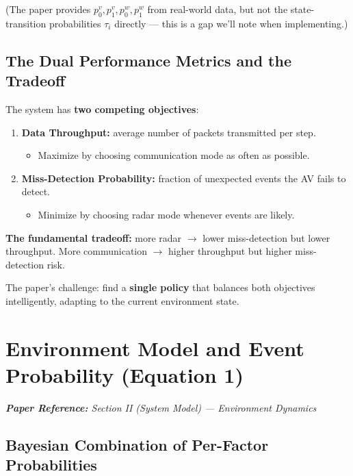 \documentclass[12pt,a4paper]{article}
\begin{document}
(The paper provides $p^v_0, p^v_1, p^w_0, p^w_1$ from real-world data, but not the state-transition probabilities $\tau_i$ directly --- this is a gap we'll note when implementing.)

\subsection{The Dual Performance Metrics and the Tradeoff}

The system has \textbf{two competing objectives}:

\begin{enumerate}
    \item \textbf{Data Throughput:} average number of packets transmitted per step.
    \begin{itemize}
        \item Maximize by choosing communication mode as often as possible.
    \end{itemize}

    \item \textbf{Miss-Detection Probability:} fraction of unexpected events the AV fails to detect.
    \begin{itemize}
        \item Minimize by choosing radar mode whenever events are likely.
    \end{itemize}
\end{enumerate}

\noindent\textbf{The fundamental tradeoff:} more radar $\rightarrow$ lower miss-detection but lower throughput. More communication $\rightarrow$ higher throughput but higher miss-detection risk.

The paper's challenge: find a \textbf{single policy} that balances both objectives intelligently, adapting to the current environment state.

\section{Environment Model and Event Probability (Equation 1)}

\noindent\textit{\textbf{Paper Reference:} Section II (System Model) --- Environment Dynamics}

\subsection{Bayesian Combination of Per-Factor Probabilities}
\end{document}
